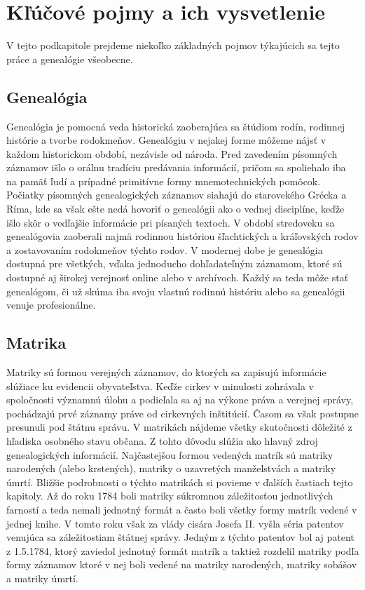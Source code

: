 \section{Kľúčové pojmy a ich vysvetlenie}
V tejto podkapitole prejdeme niekoľko základných pojmov týkajúcich sa tejto práce 
a genealógie všeobecne.
\subsection*{Genealógia}
Genealógia je pomocná veda historická zaoberajúca sa štúdiom rodín, rodinnej histórie 
a tvorbe rodokmeňov. Genealógiu v nejakej forme môžeme nájsť v každom historickom 
období, nezávisle od národa. Pred zavedením písomných záznamov išlo o orálnu tradíciu 
predávania informácií, pričom sa spoliehalo iba na pamäť ľudí a prípadné primitívne formy 
mnemotechnických pomôcok. Počiatky písomných genealogických záznamov siahajú do 
starovekého Grécka a Ríma, kde sa však ešte nedá hovoriť o genealógii ako o vednej 
disciplíne, keďže išlo skôr o vedľajšie informácie pri písaných textoch. V období stredoveku 
sa genealógovia zaoberali najmä rodinnou históriou šľachtických a kráľovských rodov 
a zostavovaním rodokmeňov týchto rodov. V modernej dobe je genealógia dostupná pre 
všetkých, vďaka jednoducho dohľadateľným záznamom, ktoré sú dostupné aj širokej 
verejnosť online alebo v archívoch. Každý sa teda môže stať genealógom, či už skúma iba 
svoju vlastnú rodinnú históriu alebo sa genealógii venuje profesionálne.

\subsection*{Matrika}
Matriky sú formou verejných záznamov, do ktorých sa zapisujú informácie slúžiace ku 
evidencii obyvateľstva. Keďže cirkev v minulosti zohrávala v spoločnosti významnú úlohu 
a podieľala sa aj na výkone práva a verejnej správy, pochádzajú prvé záznamy práve od 
cirkevných inštitúcií. Časom sa však postupne presunuli pod štátnu správu. V matrikách 
nájdeme všetky skutočnosti dôležité z hľadiska osobného stavu občana. Z tohto dôvodu 
slúžia ako hlavný zdroj genealogických informácií. Najčastejšou formou vedených matrík sú
matriky narodených (alebo krstených), matriky o uzavretých manželstvách a matriky úmrtí. 
Bližšie podrobnosti o týchto matrikách si povieme v ďalších častiach tejto kapitoly. Až do 
roku 1784 boli matriky súkromnou záležitosťou jednotlivých farností a teda nemali jednotný 
formát a často boli všetky formy matrík vedené v jednej knihe. V tomto roku však za vlády 
cisára Josefa II. vyšla séria patentov venujúca sa záležitostiam štátnej správy. Jedným 
z týchto patentov bol aj patent z 1.5.1784, ktorý zaviedol jednotný formát matrík a taktiež 
rozdelil matriky podľa formy záznamov ktoré v nej boli vedené na matriky narodených, 
matriky sobášov a matriky úmrtí. 

